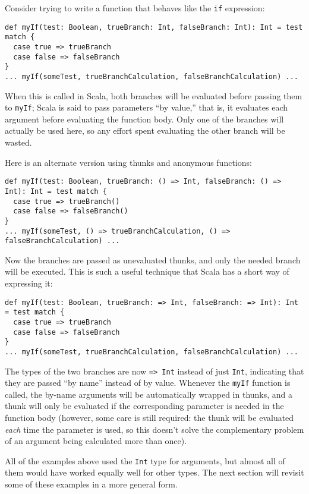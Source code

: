 \begin{itemize}
Consider trying to write a function that behaves like the \texttt{if} expression:
\begin{verbatim}
def myIf(test: Boolean, trueBranch: Int, falseBranch: Int): Int = test match {
  case true => trueBranch
  case false => falseBranch
}
... myIf(someTest, trueBranchCalculation, falseBranchCalculation) ...
\end{verbatim}
When this is called in Scala, both branches will be evaluated before passing them to \texttt{myIf}; Scala is said to pass parameters ``by value,'' that is, it evaluates each argument before evaluating the function body. Only one of the branches will actually be used here, so any effort spent evaluating the other branch will be wasted.

Here is an alternate version using thunks and anonymous functions:
\begin{verbatim}
def myIf(test: Boolean, trueBranch: () => Int, falseBranch: () => Int): Int = test match {
  case true => trueBranch()
  case false => falseBranch()
}
... myIf(someTest, () => trueBranchCalculation, () => falseBranchCalculation) ...
\end{verbatim}
Now the branches are passed as unevaluated thunks, and only the needed branch will be executed. This is such a useful technique that Scala has a short way of expressing it:
\begin{verbatim}
def myIf(test: Boolean, trueBranch: => Int, falseBranch: => Int): Int = test match {
  case true => trueBranch
  case false => falseBranch
}
... myIf(someTest, trueBranchCalculation, falseBranchCalculation) ...
\end{verbatim}
The types of the two branches are now \verb|=> Int| instead of just \texttt{Int}, indicating that they are passed ``by name'' instead of by value. Whenever the \texttt{myIf} function is called, the by-name arguments will be automatically wrapped in thunks, and a thunk will only be evaluated if the corresponding parameter is needed in the function body (however, some care is still required: the thunk will be evaluated \emph{each} time the parameter is used, so this doesn't solve the complementary problem of an argument being calculated more than once).
\end{itemize}

All of the examples above used the \verb|Int| type for arguments, but almost all of them would have worked equally well for other types. The next section will revisit some of these examples in a more general form.

